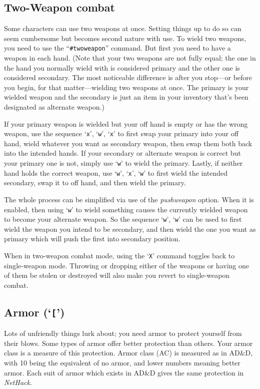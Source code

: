 \subsection*{Two-Weapon combat}

Some characters can use two weapons at once.  Setting things up to
do so can seem cumbersome but becomes second nature with use.
To wield two weapons, you need to use the ``{\tt \#twoweapon}'' command.
But first you need to have a weapon in each hand.
(Note that your two weapons are not fully equal; the one in the
hand you normally wield with is considered primary and the other
one is considered secondary.
The most noticeable difference is after you
stop---or before you begin, for that matter---wielding
two weapons at once.
The primary is your wielded weapon and the
secondary is just an item in your inventory that's been designated
as alternate weapon.)

If your primary weapon is wielded but your off hand is empty or has
the wrong weapon, use the sequence `{\tt x}', `{\tt w}', `{\tt x}' to
first swap your
primary into your off hand, wield whatever you want as secondary
weapon, then swap them both back into the intended hands.
If your secondary or alternate weapon is correct but your primary
one is not, simply use `{\tt w}' to wield the primary.
Lastly, if neither hand holds the correct weapon,
use `{\tt w}', `{\tt x}', `{\tt w}'
to first wield the intended secondary, swap it to off hand, and then
wield the primary.

The whole process can be simplified via use of the
{\it pushweapon\/}
option.  When it is enabled, then using `{\tt w}' to wield something
causes the currently wielded weapon to become your alternate weapon.
So the sequence `{\tt w}', `{\tt w}' can be used to first wield the weapon you
intend to be secondary, and then wield the one you want as primary
which will push the first into secondary position.

When in two-weapon combat mode, using the `{\tt X}' command
toggles back to single-weapon mode.
Throwing or dropping either of the
weapons or having one of them be stolen or destroyed will also make you
revert to single-weapon combat.

\subsection*{Armor (`{\tt [}')}

Lots of unfriendly things lurk about; you need armor to protect
yourself from their blows.  Some types of armor offer better
protection than others.  Your armor class is a measure of this
protection.  Armor class (AC) is measured as in AD\&D, with 10 being
the equivalent of no armor, and lower numbers meaning better armor.
Each suit of armor which exists in AD\&D gives the same protection in
{\it NetHack}.


